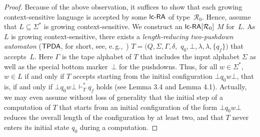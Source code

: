 \noindent
\begin{proof}
Because of the above observation, it suffices to show that each growing context-sensitive language is accepted by some $\lcRA$ of type~$\mathcal{R}_0$. Hence, assume that $L\subseteq\Sigma^*$ is growing context-sensitive. We construct an $\lcRA[0]$ $M$ for~$L$. As $L$ is growing context-sensitive, there exists a \emph{length-reducing two-pushdown automaton} (\index{$\TPDA$}$\TPDA$, for short, see, e.\,g.,~\cite{Buntrock19981}) $T = (Q,\Sigma,\Gamma,\delta,$ $q_0,\bot,\lambda,\lambda,\{q_f\})$ that accepts~$L$. Here $\Gamma$ is the tape alphabet of $T$ that includes the input alphabet $\Sigma$ as well as the special bottom marker~$\bot$ for the pushdowns. Thus, for all $w\in\Sigma^*$, $w\in L$ if and only if $T$ accepts starting from the initial configuration $\bot q_0w\bot$, that is, if and only if $\bot q_0 w\bot\vdash_T^* q_f$ holds (see \cite{N2005} Lemma 3.4 and Lemma 4.1). Actually, we may even assume without loss of generality that the initial step of a computation of $T$ that starts from an initial configuration of the form $\bot q_0w\bot$ reduces the overall length of the configuration by at least two, and that $T$ never enters its initial state $q_0$ during a computation.


\end{proof}
